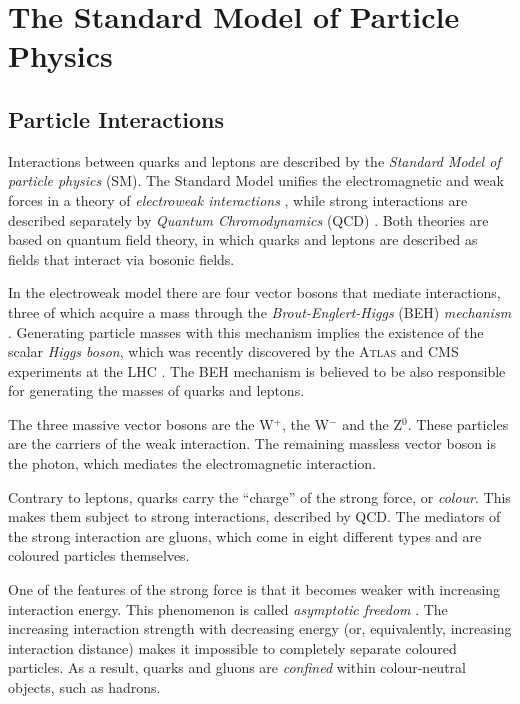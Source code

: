\section{The Standard Model of Particle Physics}

\subsection{Particle Interactions}

Interactions between quarks and leptons are described by the \emph{Standard Model of particle physics} (SM). The Standard Model unifies
the electromagnetic and weak forces in a theory of \emph{electroweak interactions} \cite{Glashow:1961tr,*Weinberg:1967tq,*Salam:1968rm},
while strong interactions are described separately by \emph{Quantum Chromodynamics} (QCD) \cite{Fritzsch:1973pi}. Both theories are
based on quantum field theory, in which quarks and leptons are described as fields that interact via bosonic fields.

In the electroweak model there are four vector bosons that mediate interactions, three of which acquire a mass through the
\emph{Brout-Englert-Higgs} (BEH) \emph{mechanism} \cite{Englert:1964et,*Higgs:1964ia,*Higgs:1964pj,*Guralnik:1964eu}. Generating particle
masses with this mechanism implies the existence of the scalar \emph{Higgs boson}, which was recently discovered by the \textsc{Atlas} and
CMS experiments at the LHC \cite{Aad:2012tfa,*Chatrchyan:2012ufa}. The BEH mechanism is believed to be also responsible for generating the
masses of quarks and leptons.

The three massive vector bosons are the W$^+$, the W$^-$ and the Z$^0$. These particles are the carriers of the weak interaction. The
remaining massless vector boson is the photon, which mediates the electromagnetic interaction.

Contrary to leptons, quarks carry the ``charge'' of the strong force, or \emph{colour}. This makes them subject to strong interactions,
described by QCD. The mediators of the strong interaction are gluons, which come in eight different types and are coloured particles
themselves.

One of the features of the strong force is that it becomes weaker with increasing interaction energy. This phenomenon is called
\emph{asymptotic freedom} \cite{Gross:1973id,*Politzer:1973fx}. The increasing interaction strength with decreasing energy (or,
equivalently, increasing interaction distance) makes it impossible to completely separate coloured particles. As a result, quarks and
gluons are \emph{confined} within colour-neutral objects, such as hadrons.

